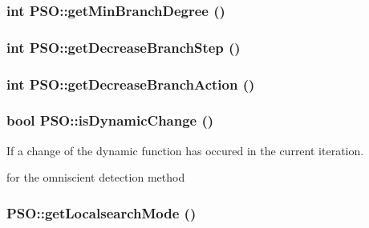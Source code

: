 \hypertarget{classPSO_a1a30065babc73a1e54a426e5a0f6369}{
\subsubsection{\setlength{\rightskip}{0pt plus 5cm}int PSO::getMinBranchDegree ()}}
\label{classPSO_a1a30065babc73a1e54a426e5a0f6369}


\hypertarget{classPSO_2d101fa4fd266e53b9fd065c3b01e258}{
\subsubsection{\setlength{\rightskip}{0pt plus 5cm}int PSO::getDecreaseBranchStep ()}}
\label{classPSO_2d101fa4fd266e53b9fd065c3b01e258}


\hypertarget{classPSO_68dd6992f7070c3e808f9331cb160521}{
\subsubsection{\setlength{\rightskip}{0pt plus 5cm}int PSO::getDecreaseBranchAction ()}}
\label{classPSO_68dd6992f7070c3e808f9331cb160521}


\hypertarget{classPSO_7407b0e27405a6d49159ff8afb0d2e18}{
\subsubsection{\setlength{\rightskip}{0pt plus 5cm}bool PSO::isDynamicChange ()}}
\label{classPSO_7407b0e27405a6d49159ff8afb0d2e18}


If a change of the dynamic function has occured in the current iteration. 

for the omniscient detection method \hypertarget{classPSO_393ccc4ad7ed55a99ca49cae4c295ccb}{
\subsubsection{ PSO::getLocalsearchMode ()}}
\label{classPSO_393ccc4ad7ed55a99ca49cae4c295ccb}


